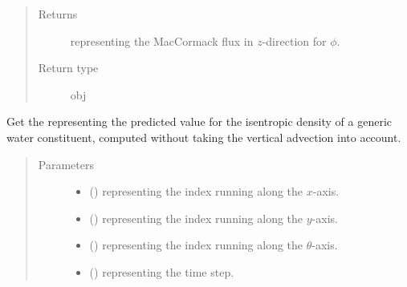\documentclass[letterpaper,10pt,english]{sphinxmanual}
\begin{document}
\begin{fulllineitems}
\begin{fulllineitems}
\begin{quote}
\begin{description}
\begin{itemize}
\end{itemize}

\item[{Returns}] \leavevmode
{} representing the MacCormack flux in \(z\)-direction for \(\phi\).

\item[{Return type}] \leavevmode
obj

\end{description}\end{quote}

\end{fulllineitems}


\begin{fulllineitems}
\label{\detokenize{api:dycore.flux_isentropic_maccormack.FluxIsentropicMacCormack._get_maccormack_horizontal_predicted_value_Q}}
Get the  representing the predicted value for the isentropic
density of a generic water constituent, computed without taking the vertical advection into account.
\begin{quote}\begin{description}
\item[{Parameters}] \leavevmode\begin{itemize}
\item {} 
 () \textendash{}  representing the index running along the \(x\)-axis.

\item {} 
 () \textendash{}  representing the index running along the \(y\)-axis.

\item {} 
 () \textendash{}  representing the index running along the \(\theta\)-axis.

\item {} 
 () \textendash{}  representing the time step.


\end{itemize}
\end{description}
\end{quote}
\end{fulllineitems}
\end{fulllineitems}
\end{document}
